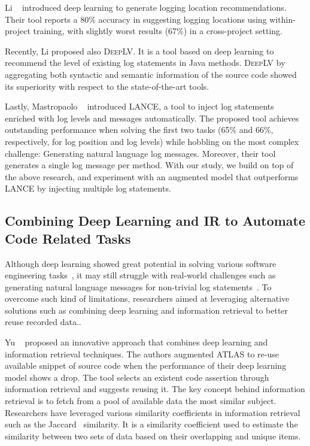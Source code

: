 Li \etal~\cite{li2020shall} introduced deep learning to generate logging location recommendations. Their tool reports a 80\% accuracy in suggesting logging locations using within-project training, with slightly worst results (67\%) in a cross-project setting.

Recently, Li \etal \cite{li2021deeplv} proposed also \textsc{DeepLV}. It is a tool based on deep learning to recommend the level of existing log statements in Java methods. \textsc{DeepLV} by aggregating both syntactic and semantic information of the source code showed its superiority with respect to the state-of-the-art tools.

Lastly, Mastropaolo \etal~\cite{mastropaolo2022using} introduced \textsc{LANCE}, a tool to inject log statements enriched with log levels and messages automatically. The proposed tool achieves outstanding performance when solving the first two tasks (65\% and 66\%, respectively, for log position and log levels) while hobbling on the most complex challenge: Generating natural language log messages. Moreover, their tool generates a single log message per method. With our study, we build on top of the above research, and experiment with an augmented model that outperforms \textsc{LANCE} by injecting multiple log statements. 

\subsection{Combining Deep Learning and IR to Automate Code Related Tasks}

Although deep learning showed great potential in solving various software engineering tasks~\cite{watsonSytematicLiterature2020}, it may still struggle with real-world challenges such as generating natural language messages for non-trivial log statements~\cite{mastropaolo2022using}. To overcome such kind of limitations, researchers aimed at leveraging alternative solutions such as combining deep learning and information retrieval to better reuse recorded data..

Yu \etal~\cite{yu2022automated} proposed an innovative approach that combines deep learning and information retrieval techniques. The authors augmented \textsc{ATLAS} to re-use available snippet of source code when the performance of their deep learning model shows a drop. The tool selects an existent code assertion through information retrieval and suggests reusing it. The key concept behind information retrieval is to fetch from a pool of available data the most similar subject. Researchers have leveraged various similarity coefficients in information retrieval such as the Jaccard~\cite{tanimoto1958elementary} similarity. It is a similarity
coefficient used to estimate the similarity between two sets of data based on their overlapping and unique items.

